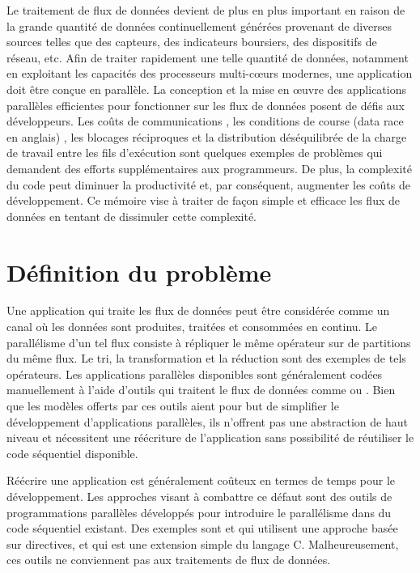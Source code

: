 \begin{introduction}

Le traitement de flux de donn\'ees devient de plus en plus important en raison de la grande quantit\'e de donn\'ees continuellement g\'en\'er\'ees provenant de diverses sources telles que des capteurs, des indicateurs boursiers, des dispositifs de r\'eseau, etc. Afin de traiter rapidement une telle quantit\'e de donn\'ees, notamment en exploitant les capacit\'es des processeurs multi-cœurs modernes, une application doit \^etre con\c cue en parall\`ele. La conception et la mise en œuvre des applications parall\`eles efficientes pour fonctionner sur les flux de donn\'ees posent de d\'efis aux d\'eveloppeurs. Les co\^uts de communications \citep{amarasinghe2011ascr}, les conditions de course (data race en anglais) \citep{wu2015detecting}, les blocages r\'eciproques \citep{haque2006concurrent} et la distribution d\'es\'equilibr\'ee de la charge de travail \citep{amarasinghe2011ascr} entre les fils d'ex\'ecution sont quelques exemples de probl\`emes qui demandent des efforts suppl\'ementaires aux programmeurs. De plus, la complexit\'e du code peut diminuer la productivit\'e et, par cons\'equent, augmenter les co\^uts de d\'eveloppement. Ce m\'emoire vise \`a traiter de fa\c con simple et efficace les flux de donn\'ees en tentant de dissimuler cette complexit\'e.

\section*{D\'efinition du probl\`eme}

Une application qui traite les flux de données peut \^etre consid\'er\'ee comme un canal o\`u les donn\'ees sont produites, trait\'ees et consomm\'ees en continu. Le parall\'elisme d'un tel flux consiste \`a r\'epliquer le m\^eme op\'erateur sur de partitions du m\^eme flux. Le tri, la transformation et la r\'eduction sont des exemples de tels op\'erateurs. Les applications parall\`eles disponibles sont g\'en\'eralement cod\'ees manuellement \`a l'aide d'outils qui traitent le flux de donn\'ees comme  \citep{aamir20142014} ou  \citep{blocks2007outfitting}. Bien que les mod\`eles offerts par ces outils aient pour but de simplifier le d\'eveloppement d'applications parall\`eles, ils n'offrent pas une abstraction de haut niveau et n\'ecessitent une r\'e\'ecriture de l'application sans possibilit\'e de r\'eutiliser le code s\'equentiel disponible.

R\'e\'ecrire une application est g\'en\'eralement co\^uteux en termes de temps pour le d\'eveloppement. Les approches visant \`a combattre ce d\'efaut sont des outils de programmations parall\`eles d\'evelopp\'es pour introduire le parall\'elisme dans du code s\'equentiel existant. Des exemples sont  \citep{chapman2008portable} et  \citep{farber2016parallel} qui utilisent une approche bas\'ee sur directives, et  \citep{leiserson1998programming} qui est une extension simple du langage C. Malheureusement, ces outils ne conviennent pas aux traitements de flux de donn\'ees.


\end{introduction}
